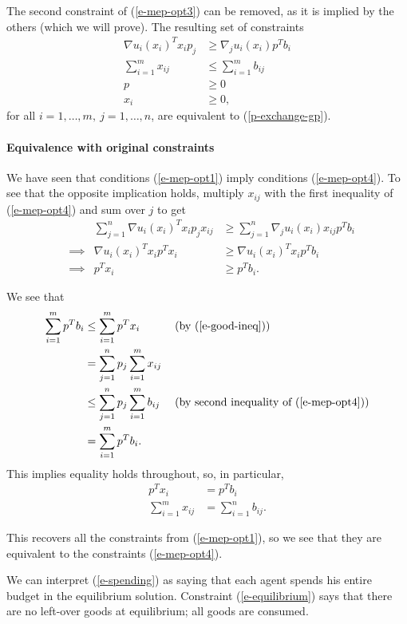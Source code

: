 \documentclass[12pt]{article}
\begin{document}
The second constraint of (\ref{e-mep-opt3}) can be removed, as it is implied by the others (which we will prove).
The resulting set of constraints
\begin{equation}
\begin{aligned}
\nabla u_i(x_i)^T x_i p_j &\geq \nabla_j u_i(x_i) p^T b_i\\
\sum_{i=1}^m x_{ij} &\leq \sum_{i=1}^m b_{ij}\\
p &\geq 0\\
x_i &\geq 0,
\end{aligned}
\label{e-mep-opt4}
\end{equation}
for all $i=1,\ldots,m,\ j=1,\ldots,n$, are equivalent to (\ref{p-exchange-gp}).

\paragraph{Equivalence with original constraints}
We have seen that conditions (\ref{e-mep-opt1}) imply conditions (\ref{e-mep-opt4}).
To see that the opposite implication holds,
multiply $x_{ij}$ with the first inequality of (\ref{e-mep-opt4}) and sum over $j$ to get
\begin{align}
&&\sum_{j=1}^n \nabla u_i(x_i)^T x_i p_j x_{ij} &\geq \sum_{j=1}^n \nabla_j u_i(x_i) x_{ij} p^T b_i \nonumber \\
&\implies & \nabla u_i(x_i)^T x_i p^T x_i &\geq \nabla u_i(x_i)^T x_i p^T b_i \nonumber\\
&\implies & p^T x_i &\geq p^T b_i. \label{e-good-ineq}
\end{align}

We see that
\begin{align*}
\sum_{i=1}^m p^T b_i &\leq \sum_{i=1}^m p^T x_i\ &&\text{(by (\ref{e-good-ineq}))}\\
&= \sum_{j=1}^n p_j \sum_{i=1}^m x_{ij} &&\\
&\leq \sum_{j=1}^n p_j \sum_{i=1}^m b_{ij}\ &&\text{(by second inequality of (\ref{e-mep-opt4}))}\\
&= \sum_{i=1}^m p^T b_i.&&
\end{align*}
This implies equality holds throughout, so, in particular,
\begin{align}
p^T x_i &= p^T b_i \label{e-spending}\\
\sum_{i=1}^m x_{ij} &= \sum_{i=1}^n b_{ij} \label{e-equilibrium}.
\end{align}

This recovers all the constraints from (\ref{e-mep-opt1}), so we see that they are equivalent to the constraints (\ref{e-mep-opt4}).

We can interpret (\ref{e-spending}) as saying that each agent spends his entire budget in the equilibrium solution. Constraint (\ref{e-equilibrium}) says that
there are no left-over goods at equilibrium; all goods are consumed.


\newpage


\end{document}
